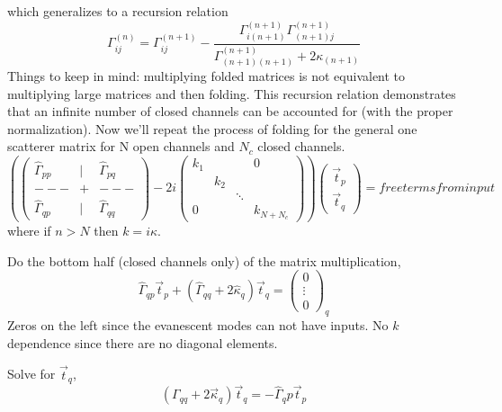 which generalizes to a recursion relation
\begin{equation}
\Gamma_{ij}^{(n)} = \Gamma_{ij}^{(n+1)} - \frac{\Gamma_{i(n+1)}^{(n+1)}
\Gamma_{(n+1)j}^{(n+1)}}{\Gamma_{(n+1)(n+1)}^{(n+1)}+2 \kappa_{(n+1)}}
\end{equation}
Things to keep in mind: multiplying folded matrices is not equivalent to multiplying large matrices and then folding.  This recursion relation demonstrates that an infinite number of closed channels can be accounted for (with the proper normalization).
Now we'll repeat the process of folding for the general one scatterer matrix for N open channels and $N_c$ closed channels.
\begin{equation}
\left(
\left( \begin{array}{ccc}
\hat{\Gamma}_{pp} & | & \hat{\Gamma}_{pq} \\
--- & + & --- \\
\hat{\Gamma}_{qp} & | &  \hat{\Gamma}_{qq} \end{array}
\right) - 2 i 
\left( \begin{array}{cccc}
k_1 &     &        & 0         \\
    & k_2 &        &           \\
    &     & \ddots &           \\
  0 &     &        & k_{N+N_c} \end{array} 
\right)
\right)
\left( \begin{array}{c}
\vec{t}_p \\
\vec{t}_q\end{array} 
\right) = free terms from input
\end{equation}
where if $n>N$ then $k=i\kappa$. 

Do the bottom half (closed channels only) of the matrix multiplication,
\begin{equation}
\hat{\Gamma}_{qp} \vec{t}_p + (\hat{\Gamma}_{qq} + 2 \hat{\kappa}_q)\vec{t}_q =
\left( \begin{array}{c}
	0 \\
	\vdots \\
	0 \end{array}
\right)_q
\end{equation}
Zeros on the left since the evanescent modes can not have inputs. No $k$ dependence since there are no diagonal elements.

Solve for $\vec{t}_q$,
\begin{equation}
(\Gamma_{qq}+2 \vec{\kappa}_q) \vec{t}_q = - \hat{\Gamma}_qp \vec{t}_p
\end{equation}

